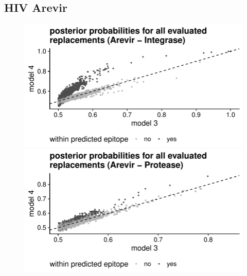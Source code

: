 \documentclass[a4paper,11pt]{article}
\begin{document}
\FloatBarrier
\subsection*{HIV Arevir}

\begin{figure}[H]
    \begin{minipage}{.49\textwidth}
      \includegraphics[width=\linewidth]{plots/posterior_p/arevir/integrase.pdf}
    \end{minipage}%
    \begin{minipage}{.49\textwidth}
      \includegraphics[width=\linewidth]{plots/posterior_p/arevir/protease.pdf}
    \end{minipage}
  
    \vspace{0.5cm}
  

\end{figure}
\end{document}
